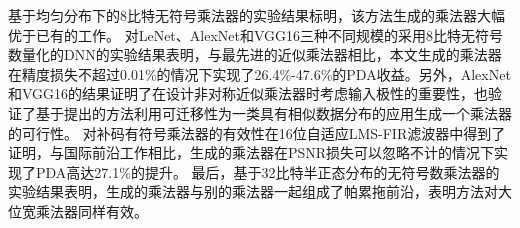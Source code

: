 基于均匀分布下的8比特无符号乘法器的实验结果标明，该方法生成的乘法器大幅优于已有的工作。
对LeNet、AlexNet和VGG16三种不同规模的采用8比特无符号数量化的DNN的实验结果表明，与最先进的近似乘法器相比，本文生成的乘法器在精度损失不超过0.01\%的情况下实现了26.4\%-47.6\%的PDA收益。另外，AlexNet和VGG16的结果证明了在设计非对称近似乘法器时考虑输入极性的重要性，也验证了基于提出的方法利用可迁移性为一类具有相似数据分布的应用生成一个乘法器的可行性。
对补码有符号乘法器的有效性在16位自适应LMS-FIR滤波器中得到了证明，与国际前沿工作相比，生成的乘法器在PSNR损失可以忽略不计的情况下实现了PDA高达27.1\%的提升。
最后，基于32比特半正态分布的无符号数乘法器的实验结果表明，生成的乘法器与别的乘法器一起组成了帕累拖前沿，表明方法对大位宽乘法器同样有效。